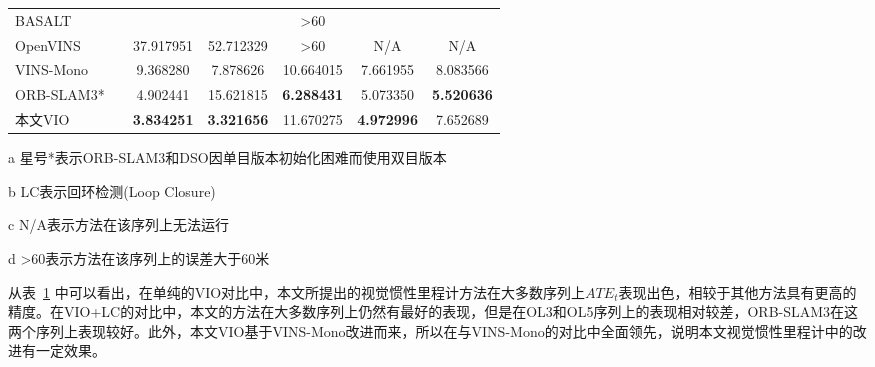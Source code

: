 \begin{table}
\begin{threeparttable}
\begin{tabular}{lcccccc}
BASALT          &                         & \multicolumn{5}{c}{\textgreater{}60}                         \\
OpenVINS        &                         & 37.917951                                & 52.712329                                & {\textgreater{}60}                               & N/A                                      & N/A                                      \\
VINS-Mono       &                         & 9.368280                                 & 7.878626                                 & 10.664015                                & 7.661955                                 & 8.083566                                 \\
ORB-SLAM3*       &                         & 4.902441                                 & 15.621815                                & \cellcolor[HTML]{FFCCC9}\textbf{6.288431}                                 & 5.073350                                 & \cellcolor[HTML]{FFCCC9}\textbf{5.520636}                                 \\
本文VIO            &                         & \cellcolor[HTML]{FFCCC9}\textbf{3.834251}                                 & \cellcolor[HTML]{FFCCC9}\textbf{3.321656}                                 & 11.670275                                & \cellcolor[HTML]{FFCCC9}\textbf{4.972996}                                 & 7.652689                                 \\ \bottomrule
\end{tabular}
\label{tab:vio_ate}
\begin{tablenotes}
  \item [a] 星号*表示ORB-SLAM3和DSO因单目版本初始化困难而使用双目版本
  \item [b] LC表示回环检测(Loop Closure)
  \item [c] N/A表示方法在该序列上无法运行
  \item [d] \textgreater{}60表示方法在该序列上的误差大于60米
\end{tablenotes}
\end{threeparttable}
\end{table}

从表~\ref{tab:vio_ate} 中可以看出，在单纯的VIO对比中，本文所提出的视觉惯性里程计方法在大多数序列上$ATE_t$表现出色，相较于其他方法具有更高的精度。在VIO+LC的对比中，本文的方法在大多数序列上仍然有最好的表现，但是在OL3和OL5序列上的表现相对较差，ORB-SLAM3在这两个序列上表现较好。此外，本文VIO基于VINS-Mono改进而来，所以在与VINS-Mono的对比中全面领先，说明本文视觉惯性里程计中的改进有一定效果。

